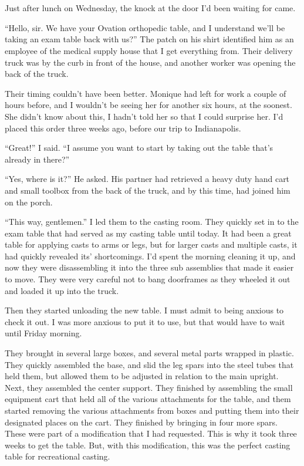 \chapter{}
Just after lunch on Wednesday, the knock at the door I'd been waiting for came.

``Hello, sir. We have your Ovation orthopedic table, and I understand we'll be taking an
exam table back with us?'' The patch on his shirt identified him as an employee of the medical
supply house that I get everything from. Their delivery truck was by the curb in front of the
house, and another worker was opening the back of the truck.

Their timing couldn't have been better. Monique had left for work a couple of hours before,
and I wouldn't be seeing her for another six hours, at the soonest. She didn't know about this,
I hadn't told her so that I could surprise her. I'd placed this order three weeks ago, before
our trip to Indianapolis.

``Great!'' I said. ``I assume you want to start by taking out the table that's already in
there?''

``Yes, where is it?'' He asked. His partner had retrieved a heavy duty hand cart and small
toolbox from the back of the truck, and by this time, had joined him on the porch.

``This way, gentlemen.'' I led them to the casting room. They quickly set in to the exam
table that had served as my casting table until today. It had been a great table for applying
casts to arms or legs, but for larger casts and multiple casts, it had quickly revealed its'
shortcomings. I'd spent the morning cleaning it up, and now they were disassembling it into the
three sub assemblies that made it easier to move. They were very careful not to bang doorframes
as they wheeled it out and loaded it up into the truck.

Then they started unloading the new table. I must admit to being anxious to check it out. I
was more anxious to put it to use, but that would have to wait until Friday morning.

They brought in several large boxes, and several metal parts wrapped in plastic. They
quickly assembled the base, and slid the leg spars into the steel tubes that held them, but
allowed them to be adjusted in relation to the main upright. Next, they assembled the center
support. They finished by assembling the small equipment cart that held all of the various
attachments for the table, and them started removing the various attachments from boxes and
putting them into their designated places on the cart. They finished by bringing in four more
spars. These were part of a modification that I had requested. This is why it took three weeks
to get the table. But, with this modification, this was the perfect casting table for
recreational casting.

